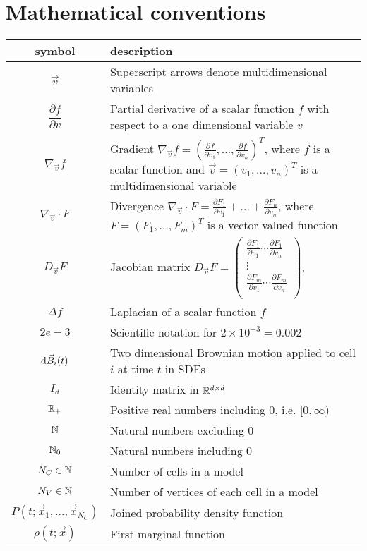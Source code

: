 \section*{Mathematical conventions}

\begin{table}[h!]
\centering
\begin{tabular}{c p{12cm}} %
\hline
symbol & description \\ 
\midrule
$\vec{v}$ & Superscript arrows denote multidimensional variables \\[0.5em] 
$\dfrac{\partial f}{\partial v}$ & Partial derivative of a scalar function $f$ with respect to a one dimensional variable $v$ \\[0.5em] 
$\nabla_{\vec{v}} f$  & Gradient $\nabla_{\vec{v}} f = (\frac{\partial f}{\partial v_1}, \ldots, \frac{\partial f}{\partial v_n})^T$, where $f$ is a scalar function and $\vec{v} = (v_1, \ldots, v_n)^T$ is a multidimensional variable  \\[0.5em]
$\nabla_{\vec{v}} \cdot F$  & Divergence $\nabla_{\vec{v}} \cdot F = \frac{\partial F_1}{\partial v_1} + \ldots + \frac{\partial F_n}{\partial v_n}$, where $F = (F_1, \ldots, F_m)^T$ is a vector valued function \\[0.5em]
$D_{\vec{v}} F$ & Jacobian matrix $D_{\vec{v}} F = \begin{pmatrix}
    \frac{\partial F_1}{\partial v_1} \cdots \frac{\partial F_1}{\partial v_n} \\
    \vdots \\
    \frac{\partial F_m}{\partial v_1} \cdots \frac{\partial F_m}{\partial v_n} \\
\end{pmatrix}$, \\
$\Delta f$ & Laplacian of a scalar function $f$ \\ 
$2e-3$ & Scientific notation for $2 \times 10^{-3} = 0.002$ \\
$\mathrm{d} \vec{B}_i(t)$ & Two dimensional Brownian motion applied to cell $i$ at time $t$ in SDEs \\
$I_d$ & Identity matrix in $\mathbb{R}^{d \times d}$  \\
$\mathbb{R}_+$ & Positive real numbers including $0$, i.e. $[0, \infty)$  \\
$\mathbb{N}$ & Natural numbers excluding $0$  \\
$\mathbb{N}_0$ & Natural numbers including $0$  \\
$N_C \in \mathbb{N}$ & Number of cells in a model \\
$N_V \in \mathbb{N}$ & Number of vertices of each cell in a model \\
$P(t; \vec{x}_1, \ldots, \vec{x}_{N_C})$ & Joined probability density function  \\
$\rho(t; \vec{x})$ & First marginal function \\
\bottomrule
\end{tabular}
\end{table}